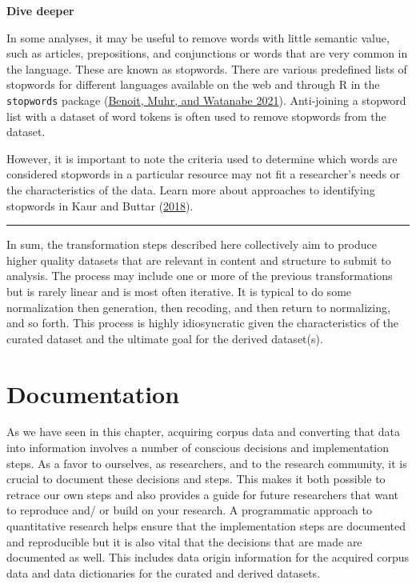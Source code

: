 \documentclass[
  letterpaper,
  DIV=11,
  numbers=noendperiod]{scrreport}
\theoremstyle{definition}
\theoremstyle{remark}
\begin{document}
\begin{tcolorbox}[enhanced jigsaw, breakable, colback=white, rightrule=.15mm, arc=.35mm, left=2mm, toprule=.15mm, leftrule=.75mm, bottomrule=.15mm, opacityback=0]

\textbf{ Dive deeper}

In some analyses, it may be useful to remove words with little semantic
value, such as articles, prepositions, and conjunctions or words that
are very common in the language. These are known as stopwords. There are
various predefined lists of stopwords for different languages available
on the web and through R in the \texttt{stopwords} package
(\protect\hyperlink{ref-R-stopwords}{Benoit, Muhr, and Watanabe 2021}).
Anti-joining a stopword list with a dataset of word tokens is often used
to remove stopwords from the dataset.

However, it is important to note the criteria used to determine which
words are considered stopwords in a particular resource may not fit a
researcher's needs or the characteristics of the data. Learn more about
approaches to identifying stopwords in Kaur and Buttar
(\protect\hyperlink{ref-Kaur2018}{2018}).

\end{tcolorbox}

\begin{center}\rule{0.5\linewidth}{0.5pt}\end{center}

In sum, the transformation steps described here collectively aim to
produce higher quality datasets that are relevant in content and
structure to submit to analysis. The process may include one or more of
the previous transformations but is rarely linear and is most often
iterative. It is typical to do some normalization then generation, then
recoding, and then return to normalizing, and so forth. This process is
highly idiosyncratic given the characteristics of the curated dataset
and the ultimate goal for the derived dataset(s).

\hypertarget{sec-ud-documentation}{%
\section{Documentation}\label{sec-ud-documentation}}

As we have seen in this chapter, acquiring corpus data and converting
that data into information involves a number of conscious decisions and
implementation steps. As a favor to ourselves, as researchers, and to
the research community, it is crucial to document these decisions and
steps. This makes it both possible to retrace our own steps and also
provides a guide for future researchers that want to reproduce and/ or
build on your research. A programmatic approach to quantitative research
helps ensure that the implementation steps are documented and
reproducible but it is also vital that the decisions that are made are
documented as well. This includes data origin information for the
acquired corpus data and data dictionaries for the curated and derived
datasets.
\end{document}
